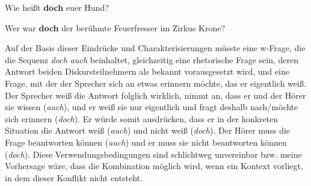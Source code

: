 {\begin{exe}
	\ex\label{873}
	Wie heißt \textbf{doch} euer Hund?
	\hfill\hbox{\citet[114]{Helbig1990}}
\end{exe}
	
\begin{exe}
	\ex\label{874}
	Wer war \textbf{doch} der berühmte Feuerfresser im Zirkus Krone?\\
	\hbox{}\hfill\hbox{\citet[88]{Dahl1988}}	
\end{exe}
Auf der Basis dieser Eindrücke und Charakterisierungen müsste eine w-Frage, die die Sequenz \textit{doch auch} beinhaltet, gleichzeitig eine rhetorische Frage sein, deren Antwort beiden Diskursteilnehmern als bekannt vorausgesetzt wird, und eine Frage, mit der der Sprecher sich an etwas erinnern möchte, das er eigentlich weiß. Der Sprecher weiß die Antwort folglich wirklich, nimmt an, dass er und der Hörer sie wissen (\textit{auch}), und er weiß sie nur eigentlich und fragt deshalb nach/möchte sich erinnern (\textit{doch}). Er würde somit ausdrücken, dass er in der konkreten Situation die Antwort weiß (\textit{auch}) und nicht weiß (\textit{doch}). Der Hörer muss die Frage beantworten können (\textit{auch}) und er muss sie nicht beantworten können (\textit{doch}). Diese Verwendungsbedingungen sind schlichtweg unvereinbar bzw. meine Vorhersage wäre, dass die Kombination möglich wird, wenn ein Kontext vorliegt, in dem dieser Konflikt nicht entsteht.\largerpage

}
